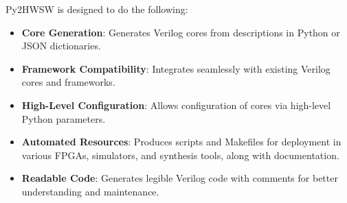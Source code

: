 %

Py2HWSW is designed to do the following:
\begin{itemize}
    \item \textbf{Core Generation}: Generates Verilog cores from descriptions in Python or JSON dictionaries.

    \item \textbf{Framework Compatibility}: Integrates seamlessly with existing Verilog cores and frameworks.

    \item \textbf{High-Level Configuration}: Allows configuration of cores via high-level Python parameters.

    \item \textbf{Automated Resources}: Produces scripts and Makefiles for deployment in various FPGAs, simulators, and synthesis tools, along with documentation.

    \item \textbf{Readable Code}: Generates legible Verilog code with comments for better understanding and maintenance.

\end{itemize}
